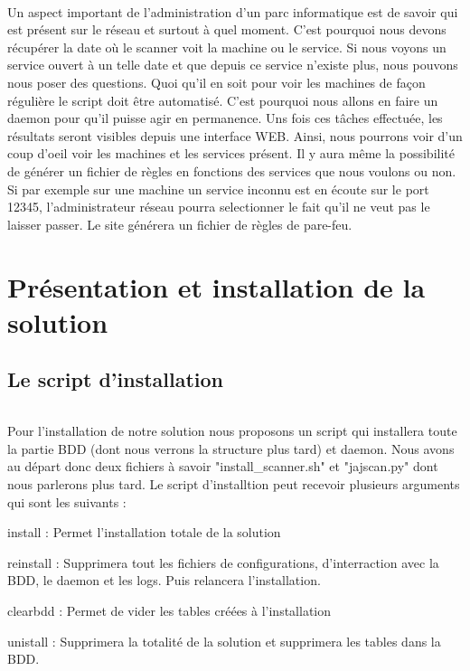 \documentclass[12pt]{report}
\begin{document}
		\paragraph{}
			Un aspect important de l'administration d'un parc informatique est de savoir qui est présent sur le réseau et surtout à quel moment. C'est pourquoi nous devons récupérer la date où le scanner voit la machine ou le service. Si nous voyons un service ouvert à un telle date et que depuis ce service n'existe plus, nous pouvons nous poser des questions. Quoi qu'il en soit pour voir les machines de façon régulière le script doit être automatisé. C'est pourquoi nous allons en faire un daemon pour qu'il puisse agir en permanence. Uns fois ces tâches effectuée, les résultats seront visibles depuis une interface WEB. Ainsi, nous pourrons voir d'un coup d'oeil voir les machines et les services présent. Il y aura même la possibilité de générer un fichier de règles en fonctions des services que nous voulons ou non. Si par exemple sur une machine un service inconnu est en écoute sur le port 12345, l'administrateur réseau pourra selectionner le fait qu'il ne veut pas le laisser passer. Le site générera un fichier de règles de pare-feu.
\part{Présentation et installation de la solution}
	\chapter{Le script d'installation}
		\paragraph{}
			Pour l'installation de notre solution nous proposons un script qui installera toute la partie BDD (dont nous verrons la structure plus tard) et daemon. Nous avons au départ donc deux fichiers à savoir "install\_scanner.sh" et "jajscan.py" dont nous parlerons plus tard. Le script d'installtion peut recevoir plusieurs arguments qui sont les suivants :
			\begin{description}
				\item install : Permet l'installation totale de la solution
				\item reinstall : Supprimera tout les fichiers de configurations, d'interraction avec la BDD, le daemon et les logs. Puis relancera l'installation.
				\item clearbdd : Permet de vider les tables créées à l'installation
				\item unistall : Supprimera la totalité de la solution et supprimera les tables dans la BDD.
			\end{description}
\end{document}
